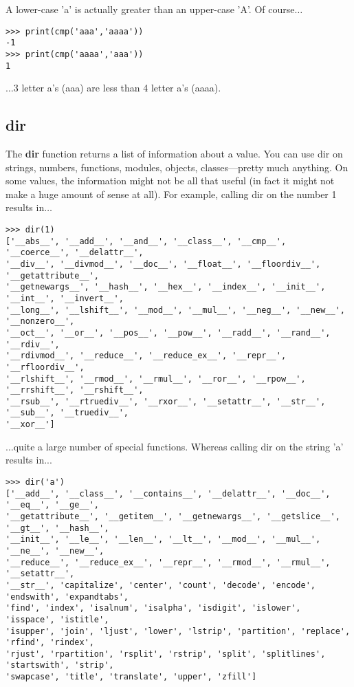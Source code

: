 A lower-case 'a' is actually greater than an upper-case 'A'. Of course$\ldots$

\begin{listing}
\begin{verbatim}
>>> print(cmp('aaa','aaaa'))
-1
>>> print(cmp('aaaa','aaa'))
1
\end{verbatim}
\end{listing}

\noindent
$\ldots$3 letter a's (aaa) are less than 4 letter a's (aaaa).

\subsection*{dir}

The \textbf{dir} function returns a list of information about a value.  You can use dir on strings, numbers, functions, modules, objects, classes---pretty much anything.  On some values, the information might not be all that useful (in fact it might not make a huge amount of sense at all).  For example, calling dir on the number 1 results in$\ldots$

\begin{listingignore}
\begin{verbatim}
>>> dir(1)
['__abs__', '__add__', '__and__', '__class__', '__cmp__', '__coerce__', '__delattr__', 
'__div__', '__divmod__', '__doc__', '__float__', '__floordiv__', '__getattribute__', 
'__getnewargs__', '__hash__', '__hex__', '__index__', '__init__', '__int__', '__invert__', 
'__long__', '__lshift__', '__mod__', '__mul__', '__neg__', '__new__', '__nonzero__', 
'__oct__', '__or__', '__pos__', '__pow__', '__radd__', '__rand__', '__rdiv__', 
'__rdivmod__', '__reduce__', '__reduce_ex__', '__repr__', '__rfloordiv__', 
'__rlshift__', '__rmod__', '__rmul__', '__ror__', '__rpow__', '__rrshift__', '__rshift__',
'__rsub__', '__rtruediv__', '__rxor__', '__setattr__', '__str__', '__sub__', '__truediv__',
'__xor__']
\end{verbatim}
\end{listingignore}

$\ldots$quite a large number of special functions. Whereas calling dir on the string 'a' results in...

\begin{listingignore}
\begin{verbatim}
>>> dir('a')
['__add__', '__class__', '__contains__', '__delattr__', '__doc__', '__eq__', '__ge__', 
'__getattribute__', '__getitem__', '__getnewargs__', '__getslice__', '__gt__', '__hash__',
'__init__', '__le__', '__len__', '__lt__', '__mod__', '__mul__', '__ne__', '__new__', 
'__reduce__', '__reduce_ex__', '__repr__', '__rmod__', '__rmul__', '__setattr__', 
'__str__', 'capitalize', 'center', 'count', 'decode', 'encode', 'endswith', 'expandtabs', 
'find', 'index', 'isalnum', 'isalpha', 'isdigit', 'islower', 'isspace', 'istitle', 
'isupper', 'join', 'ljust', 'lower', 'lstrip', 'partition', 'replace', 'rfind', 'rindex', 
'rjust', 'rpartition', 'rsplit', 'rstrip', 'split', 'splitlines', 'startswith', 'strip', 
'swapcase', 'title', 'translate', 'upper', 'zfill']
\end{verbatim}
\end{listingignore}

